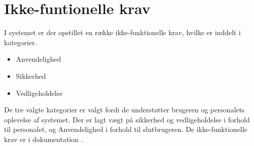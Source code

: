 \section{Ikke-funtionelle krav}

I systemet er der opstillet en række ikke-funktionelle krav, hvilke er inddelt i kategorier.

\begin{itemize}
  \item Anvendelighed
  \item Sikkerhed
  \item Vedligeholdelse
\end{itemize}

De tre valgte kategorier er valgt fordi de understøtter brugeren og personalets oplevelse af systemet. Der er lagt vægt på sikkerhed og vedligeholdelse i forhold til personalet, og Anvendelighed i forhold til slutbrugeren. De ikke-funktionelle krav er i dokumentation \cite[Ikke-funktionelle krav]{doocumentation-kravspec}.